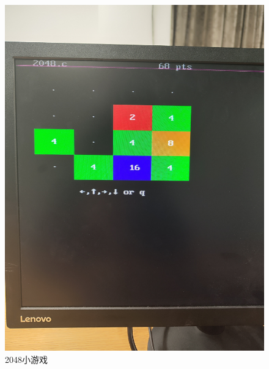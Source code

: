 \documentclass{article}
\begin{document}
\begin{figure}[htbp]
\begin{minipage}[b]{0.45\textwidth}
      \includegraphics[width=\textwidth]{./imgs/2048.jpg}
      \caption{2048小游戏}
    \end{minipage}
  \end{figure}
\end{document}
